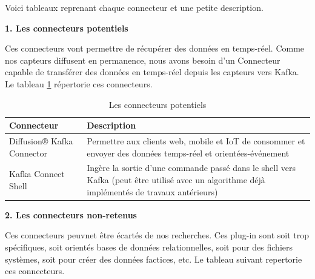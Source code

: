 \documentclass{article}
\begin{document}
			Voici tableaux reprenant chaque connecteur et une petite description.\par
			\textbf{1. Les connecteurs potentiels}\par
			Ces connecteurs vont permettre de récupérer des données en temps-réel. 
			Comme nos capteurs diffusent en permanence, nous avons besoin d’un Connecteur capable de transférer des données en temps-réel depuis les capteurs vers Kafka.
			Le tableau \ref{tab:potentiels} répertorie ces connecteurs.\par
			\begin{table}[h]
				\begin{tabular}{|p{7.5cm}|p{7.5cm}|}
					\hline
					\rowcolor{lightgray} Connecteur & Description\\\hline
					Diffusion® Kafka Connector & Permettre aux clients web, mobile et IoT de consommer et envoyer des données temps-réel et orientées-événement\\\hline
					Kafka Connect Shell & Ingère la sortie d’une commande passé dans le shell vers Kafka (peut être utilisé avec un algorithme déjà implémentés de travaux antérieurs) \\\hline
				\end{tabular}
				\caption{Les connecteurs potentiels}
				\label{tab:potentiels}
			\end{table}\par
			\textbf{2. Les connecteurs non-retenus}\par
			Ces connecteurs peuvnet être écartés de nos recherches. 
			Ces plug-in sont soit trop spécifiques, soit orientés bases de données relationnelles, soit pour des fichiers systèmes, soit pour créer des données factices, etc.
			Le tableau suivant repertorie ces connecteurs.
\end{document}
